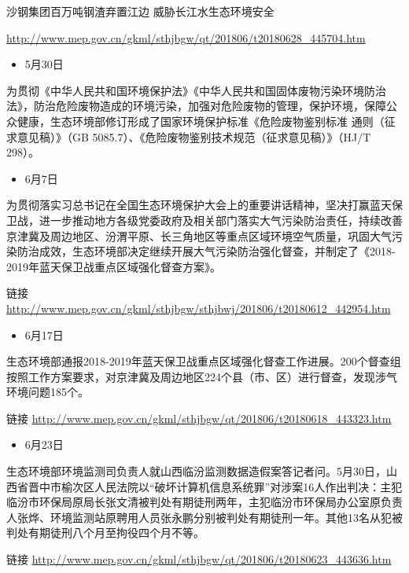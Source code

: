 \documentclass[]{book}
\providecommand{\tightlist}{%
  \setlength{\itemsep}{0pt}\setlength{\parskip}{0pt}}
\begin{document}
沙钢集团百万吨钢渣弃置江边 威胁长江水生态环境安全

\url{http://www.mep.gov.cn/gkml/sthjbgw/qt/201806/t20180628_445704.htm}

\begin{itemize}
\tightlist
\item
  5月30日
\end{itemize}

为贯彻《中华人民共和国环境保护法》《中华人民共和国固体废物污染环境防治法》，防治危险废物造成的环境污染，加强对危险废物的管理，保护环境，保障公众健康，生态环境部修订形成了国家环境保护标准《危险废物鉴别标准
通则（征求意见稿）》（GB
5085.7）、《危险废物鉴别技术规范（征求意见稿）》（HJ/T 298）。

\begin{itemize}
\tightlist
\item
  6月7日
\end{itemize}

为贯彻落实习总书记在全国生态环境保护大会上的重要讲话精神，坚决打赢蓝天保卫战，进一步推动地方各级党委政府及相关部门落实大气污染防治责任，持续改善京津冀及周边地区、汾渭平原、长三角地区等重点区域环境空气质量，巩固大气污染防治成效，生态环境部决定继续开展大气污染防治强化督查，并制定了《2018-2019年蓝天保卫战重点区域强化督查方案》。

链接
\url{http://www.mep.gov.cn/gkml/sthjbgw/sthjbwj/201806/t20180612_442954.htm}

\begin{itemize}
\tightlist
\item
  6月17日
\end{itemize}

生态环境部通报2018-2019年蓝天保卫战重点区域强化督查工作进展。200个督查组按照工作方案要求，对京津冀及周边地区224个县（市、区）进行督查，发现涉气环境问题185个。

链接
\url{http://www.mep.gov.cn/gkml/sthjbgw/qt/201806/t20180618_443323.htm}

\begin{itemize}
\tightlist
\item
  6月23日
\end{itemize}

生态环境部环境监测司负责人就山西临汾监测数据造假案答记者问。5月30日，山西省晋中市榆次区人民法院以``破坏计算机信息系统罪''对涉案16人作出判决：主犯临汾市环保局原局长张文清被判处有期徒刑两年，主犯临汾市环保局办公室原负责人张烨、环境监测站原聘用人员张永鹏分别被判处有期徒刑一年。其他13名从犯被判处有期徒刑八个月至拘役四个月不等。

链接
\url{http://www.mep.gov.cn/gkml/sthjbgw/qt/201806/t20180623_443636.htm}
\end{document}
